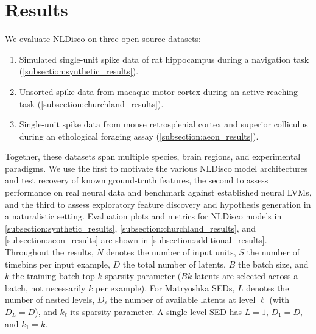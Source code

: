 \section{Results}
\label{section:results}

We evaluate NLDisco on three open-source datasets:

\begin{enumerate}[topsep=1pt,itemsep=1pt,parsep=0pt]
    \item Simulated single-unit spike data of rat hippocampus during a navigation task (\hyperref[subsection:synthetic_results]{\ref*{subsection:synthetic_results}}).
    \item Unsorted spike data from macaque motor cortex during an active reaching task (\hyperref[subsection:churchland_results]{\ref*{subsection:churchland_results}}).
    \item Single-unit spike data from mouse retrosplenial cortex and superior colliculus during an ethological foraging assay (\hyperref[subsection:aeon_results]{\ref*{subsection:aeon_results}}).
\end{enumerate}

Together, these datasets span multiple species, brain regions, and experimental paradigms. We use the first to motivate the various NLDisco model architectures and test recovery of known ground-truth features, the second to assess performance on real neural data and benchmark against established neural LVMs, and the third to assess exploratory feature discovery and hypothesis generation in a naturalistic setting. Evaluation plots and metrics for NLDisco models in \hyperref[subsection:synthetic_results]{\ref*{subsection:synthetic_results}}, \hyperref[subsection:churchland_results]{\ref*{subsection:churchland_results}}, and \hyperref[subsection:aeon_results]{\ref*{subsection:aeon_results}} are shown in \hyperref[subsection:additional_results]{\ref*{subsection:additional_results}}. Throughout the results, $N$ denotes the number of input units, $S$ the number of timebins per input example, $D$ the total number of latents, $B$ the batch size, and $k$ the training batch top-$k$ sparsity parameter ($Bk$ latents are selected across a batch, not necessarily $k$ per example). For Matryoshka SEDs, $L$ denotes the number of nested levels, $D_\ell$ the number of available latents at level $\ell$ (with $D_L=D$), and $k_\ell$ its sparsity parameter. A single-level SED has $L=1$, $D_1=D$, and $k_1=k$.


